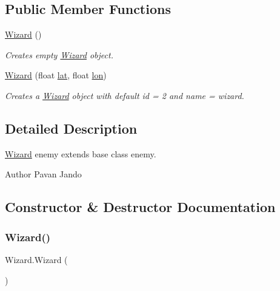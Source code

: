 \subsection*{Public Member Functions}
\begin{DoxyCompactItemize}
\item 
\mbox{\hyperlink{class_wizard_ad831542d7ffe9f2c23514a66fbd46e9c}{Wizard}} ()
\begin{DoxyCompactList}\small\item\em Creates empty \mbox{\hyperlink{class_wizard}{Wizard}} object. \end{DoxyCompactList}\item 
\mbox{\hyperlink{class_wizard_adf1af8eec90b862b7456921d638f40ad}{Wizard}} (float \mbox{\hyperlink{class_enemy_adda4a5f0af5eb4dc061e162ee46e940c}{lat}}, float \mbox{\hyperlink{class_enemy_a8ae77cbcd385c768eb0649a31718a08e}{lon}})
\begin{DoxyCompactList}\small\item\em Creates a \mbox{\hyperlink{class_wizard}{Wizard}} object with default id = 2 and name = wizard. \end{DoxyCompactList}\end{DoxyCompactItemize}


\subsection{Detailed Description}
\mbox{\hyperlink{class_wizard}{Wizard}} enemy extends base class enemy. 

\begin{DoxyAuthor}{Author}
Pavan Jando
\end{DoxyAuthor}


\subsection{Constructor \& Destructor Documentation}
\mbox{\label{class_wizard_ad831542d7ffe9f2c23514a66fbd46e9c}} 
\subsubsection{\texorpdfstring{Wizard()}{Wizard()}\hspace{0.1cm}{\footnotesize\ttfamily [1/2]}}
{\footnotesize\ttfamily Wizard.\+Wizard (\begin{DoxyParamCaption}{ }\end{DoxyParamCaption})}



